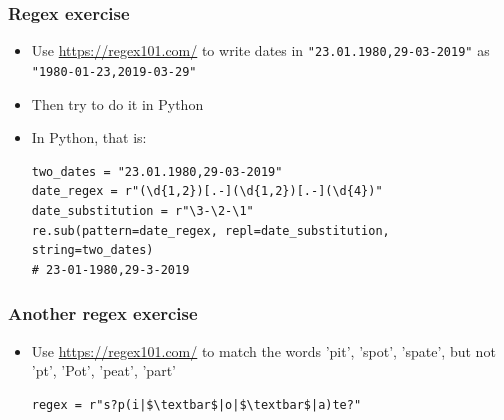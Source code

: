 \documentclass[xcolor=table]{beamer}
\begin{document}

\begin{frame}[fragile]
    \frametitle{Regex exercise}
    \begin{itemize}
        \item Use \url{https://regex101.com/} to write dates in \texttt{"23.01.1980,29-03-2019"} as \texttt{"1980-01-23,2019-03-29"} \pause
        \item Then try to do it in Python \pause 
        \item In Python, that is:
\begin{lstlisting}[style=python,belowskip=-1.5 \baselineskip]
two_dates = "23.01.1980,29-03-2019" 
date_regex = r"(\d{1,2})[.-](\d{1,2})[.-](\d{4})"
date_substitution = r"\3-\2-\1"
re.sub(pattern=date_regex, repl=date_substitution, string=two_dates)
# 23-01-1980,29-3-2019 
\end{lstlisting} 
    \end{itemize}
\end{frame}

\begin{frame}[fragile]
    \frametitle{Another regex exercise}
    \begin{itemize}
        \item Use \url{https://regex101.com/} to match the words 'pit', 'spot', 'spate', but not 'pt', 'Pot', 'peat', 'part' \pause
\begin{lstlisting}[style=python,belowskip=-1.5 \baselineskip]
    regex = r"s?p(i|$\textbar$|o|$\textbar$|a)te?"
\end{lstlisting} 
    \end{itemize}
\end{frame}

\end{document}
